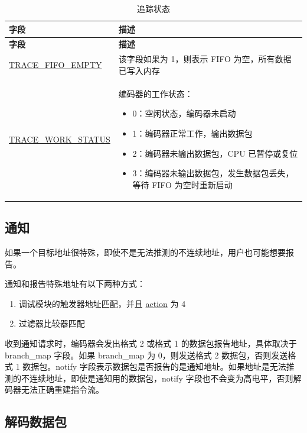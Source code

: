 \documentclass[main\_\_CN.tex]{subfiles}
\begin{document}
\begin{longtable}[c]{ |l|L{10cm}| }
    \caption{追踪状态}
    \label{riscvtracenc-trace-status}
    \\\hline{}
    \textbf{字段} & \textbf{描述} \\\hline
    \endfirsthead

    \textbf{字段} & \textbf{描述} \\\hline
    \endhead
    \endfoot
    \endlastfoot

    \hyperref[fielddesc:TRACEFIFOEMPTY]{TRACE\_FIFO\_EMPTY} & 该字段如果为 1，则表示 FIFO 为空，所有数据已写入内存 \\\hline
    \hyperref[fielddesc:TRACEWORKSTATUS]{TRACE\_WORK\_STATUS} & 编码器的工作状态：
    \begin{itemize}
        \item 0：空闲状态，编码器未启动
        \item 1：编码器正常工作，输出数据包
        \item 2：编码器未输出数据包，CPU 已暂停或复位
        \item 3：编码器未输出数据包，发生数据包丢失，等待 FIFO 为空时重新启动
    \end{itemize}
    \\\hline

\end{longtable}

\subsection{通知}

如果一个目标地址很特殊，即使不是无法推测的不连续地址，用户也可能想要报告。

通知和报告特殊地址有以下两种方式：
\begin{enumerate}
    \item 调试模块的触发器地址匹配，并且 \hyperref[fielddesc:MCONTROLACTION]{action} 为 4
    \item 过滤器比较器匹配
\end{enumerate}

收到通知请求时，编码器会发出格式 2 或格式 1 的数据包报告地址，具体取决于 branch\_map 字段。如果 branch\_map 为 0，则发送格式 2 数据包，否则发送格式 1 数据包。notify 字段表示数据包是否报告的是通知地址。如果地址是无法推测的不连续地址，即使是通知用的数据包，notify 字段也不会变为高电平，否则解码器无法正确重建指令流。

\subsection{解码数据包}
\end{document}
